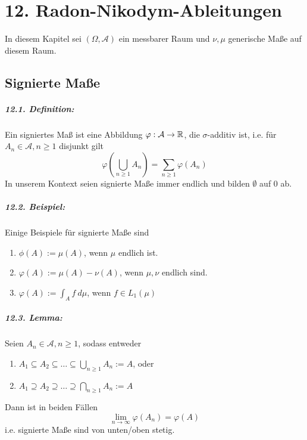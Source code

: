\documentclass[11pt]{report}
\begin{document}

\chapter*{12. Radon-Nikodym-Ableitungen}
In diesem Kapitel sei $(\Omega,\mathcal{A})$ ein messbarer Raum und $\nu,\mu$ generische Ma\ss{}e auf diesem Raum.
\section*{Signierte Ma\ss{}e}
 
 \paragraph{12.1. Definition:} Ein signiertes Ma\ss{} ist eine Abbildung $\varphi:\mathcal{A}\to\mathbb{R}$, die $\sigma$-additiv ist, i.e. f\"ur $A_n\in\mathcal{A},n\geq1$ disjunkt gilt
 $$\varphi\left(\bigcup_{n\geq1}A_n\right)=\sum_{n\geq1}\varphi(A_n)$$
 In unserem Kontext seien signierte Ma\ss{}e immer endlich und bilden $\emptyset$ auf $0$ ab.
 
 \paragraph{12.2. Beispiel:} Einige Beispiele f\"ur signierte Ma\ss{}e sind
 \begin{enumerate}[label=(\roman*)]
     \item $\phi(A):=\mu(A)$, wenn $\mu$ endlich ist.
     \item $\varphi(A):=\mu(A)-\nu(A)$, wenn $\mu,\nu$ endlich sind.
     \item $\varphi(A):=\int_A f\ d\mu$, wenn $f\in L_1(\mu)$
 \end{enumerate}
 
 \paragraph{12.3. Lemma:} Seien $A_n\in\mathcal{A},n\geq1$, sodass entweder
 \begin{enumerate}[label=(\roman*)]
     \item $A_1\subseteq A_2\subseteq\hdots\subseteq\bigcup_{n\geq1}A_n:=A$, oder
     \item $A_1\supseteq A_2\supseteq\hdots\supseteq\bigcap_{n\geq1}A_n:=A$
 \end{enumerate}
 Dann ist in beiden F\"allen 
 $$\lim_{n\to\infty}\varphi(A_n)=\varphi(A)$$
 i.e. signierte Ma\ss{}e sind von unten/oben stetig.
 
\end{document}
